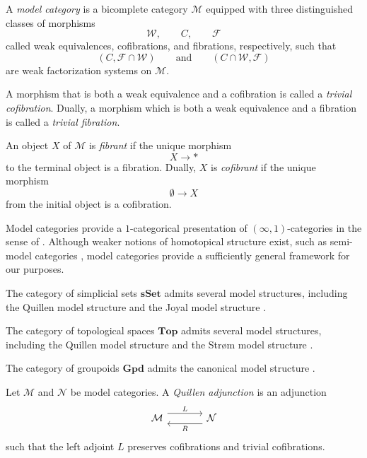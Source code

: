 \documentclass{tac}
\begin{document}
\begin{definition}
A \emph{model category} is a bicomplete category $\mathcal{M}$ equipped with
three distinguished classes of morphisms
\[
\mathcal{W},\qquad C,\qquad \mathcal{F}
\]
called weak equivalences, cofibrations, and fibrations, respectively, such that
\[
(C,\mathcal{F}\cap\mathcal{W})
\qquad\text{and}\qquad
(C\cap\mathcal{W},\mathcal{F})
\]
are weak factorization systems on $\mathcal{M}$.
\end{definition}

A morphism that is both a weak equivalence and a cofibration is called a
\emph{trivial cofibration}. Dually, a morphism which is both a weak equivalence
and a fibration is called a \emph{trivial fibration}.

An object $X$ of $\mathcal{M}$ is \emph{fibrant} if the unique morphism
\[
X\longrightarrow *
\]
to the terminal object is a fibration. Dually, $X$ is \emph{cofibrant} if the
unique morphism
\[
\emptyset\longrightarrow X
\]
from the initial object is a cofibration.

Model categories provide a $1$-categorical presentation of
$(\infty,1)$-categories in the sense of \cite{RiehlVerity2020}. Although weaker
notions of homotopical structure exist, such as semi-model categories
\cite{hov3}, model categories provide a sufficiently general framework for our
purposes.

\begin{example}
The category of simplicial sets $\mathbf{sSet}$ admits several model
structures, including the Quillen model structure \cite{JarGo} and the Joyal
model structure \cite{Joyal1}.
\end{example}

\begin{example}
The category of topological spaces $\mathbf{Top}$ admits several model
structures, including the Quillen model structure \cite{Quillen67} and the
Strøm model structure \cite{Strom}.
\end{example}

\begin{example}
The category of groupoids $\mathbf{Gpd}$ admits the canonical model structure
\cite{And1}.
\end{example}

\begin{definition}
Let $\mathcal{M}$ and $\mathcal{N}$ be model categories. A
\emph{Quillen adjunction} is an adjunction
\[
\begin{tikzcd}[column sep=large]
\mathcal{M}
\arrow[r, shift left=1.2ex, "L"]
&
\mathcal{N}
\arrow[l, shift left=1.2ex, "R"]
\end{tikzcd}
\]
such that the left adjoint $L$ preserves cofibrations and trivial
cofibrations.
\end{definition}
\end{document}
